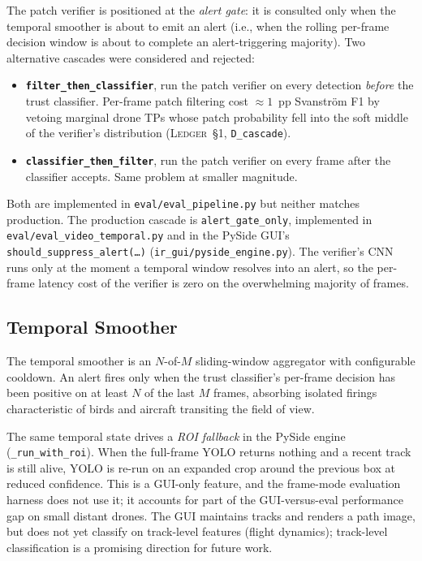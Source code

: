 The patch verifier is positioned at the \emph{alert gate}: it is consulted only when the temporal smoother is about to emit an alert (i.e., when the rolling per-frame decision window is about to complete an alert-triggering majority). Two alternative cascades were considered and rejected:

\begin{itemize}
    \item \textbf{\texttt{filter\_then\_classifier}}, run the patch verifier on every detection \emph{before} the trust classifier. Per-frame patch filtering cost $\approx 1$~pp Svanstr\"om F1 by vetoing marginal drone TPs whose patch probability fell into the soft middle of the verifier's distribution (\textsc{Ledger}~\S1, \texttt{D\_cascade}).
    \item \textbf{\texttt{classifier\_then\_filter}}, run the patch verifier on every frame after the classifier accepts. Same problem at smaller magnitude.
\end{itemize}

Both are implemented in \texttt{eval/eval\_pipeline.py} but neither matches production. The production cascade is \texttt{alert\_gate\_only}, implemented in \texttt{eval/eval\_video\_temporal.py} and in the PySide GUI's \texttt{should\_suppress\_alert(\dots)} (\texttt{ir\_gui/pyside\_engine.py}). The verifier's CNN runs only at the moment a temporal window resolves into an alert, so the per-frame latency cost of the verifier is zero on the overwhelming majority of frames.

\subsection{Temporal Smoother}
\label{sec:temporal}

The temporal smoother is an $N$-of-$M$ sliding-window aggregator with configurable cooldown. An alert fires only when the trust classifier's per-frame decision has been positive on at least $N$ of the last $M$ frames, absorbing isolated firings characteristic of birds and aircraft transiting the field of view.

The same temporal state drives a \emph{ROI fallback} in the PySide engine (\texttt{\_run\_with\_roi}). When the full-frame YOLO returns nothing and a recent track is still alive, YOLO is re-run on an expanded crop around the previous box at reduced confidence. This is a GUI-only feature, and the frame-mode evaluation harness does not use it; it accounts for part of the GUI-versus-eval performance gap on small distant drones. The GUI maintains tracks and renders a path image, but does not yet classify on track-level features (flight dynamics); track-level classification is a promising direction for future work.

